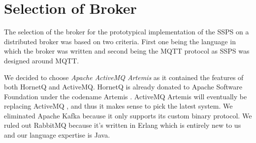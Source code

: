 \section{Selection of Broker}

The selection of the broker for the prototypical implementation of the SSPS on a distributed broker was based on two criteria. First one being the language in which the broker was written and second being the MQTT protocol as SSPS was designed around MQTT.

We decided to choose \textit{Apache ActiveMQ Artemis} as it contained the features of both HornetQ and ActiveMQ. HornetQ is already donated to Apache Software Foundation under the codename Artemis \parencite{artemis_vs_activemq}. ActiveMQ Artemis will eventually be replacing ActiveMQ \parencite{artemis_vs_activemq}, and thus it makes sense to pick the latest system. We eliminated Apache Kafka because it only supports its custom binary protocol. We ruled out RabbitMQ because it's written in Erlang which is entirely new to us and our language expertise is Java.


